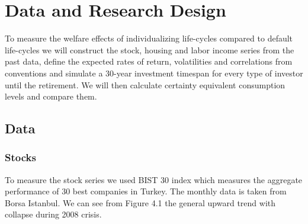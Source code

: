 \chapter{Data and Research Design}
\label{data}

To measure the welfare effects of individualizing life-cycles compared to default life-cycles we will construct the stock, housing and labor income series from the past data, define the expected rates of return, volatilities and correlations from conventions and simulate a 30-year investment timespan for every type of investor until the retirement. We will then calculate certainty equivalent consumption levels and compare them. 

\section{Data}

\subsection{Stocks}
To measure the stock series we used BIST 30 index which measures the aggregate performance of 30 best companies in Turkey. The monthly data is taken from Borsa Istanbul. We can see from Figure 4.1 the general upward trend with collapse during 2008 crisis.

